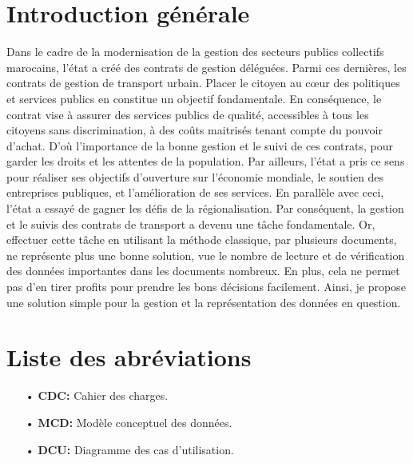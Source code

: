 \documentclass[a4paper]{report}
\begin{document}
\newpage

\begin{doublespace}
	\chapter*{\centering Introduction générale}

	Dans le cadre de la modernisation de la gestion des secteurs publics
	collectifs
	marocains, l’état a créé des contrats de gestion déléguées. Parmi ces
	dernières, les
	contrats de gestion de transport urbain. Placer le citoyen au cœur des
	politiques et
	services publics en constitue un objectif fondamentale. En conséquence, le
	contrat
	vise à assurer des services publics de qualité, accessibles à tous les
	citoyens sans discrimination, à des coûts maitrisés tenant compte du
	pouvoir
	d’achat. D'où  l'importance de la bonne gestion et le suivi de ces
	contrats, pour garder
	les droits et les attentes de la population.
	Par ailleurs, l’état a pris ce sens pour réaliser ses objectifs d’ouverture
	sur l’économie
	mondiale, le soutien des entreprises publiques, et l’amélioration de ses
	services.
	En parallèle avec ceci, l’état a essayé de gagner les défis de la
	régionalisation.
	Par conséquent, la gestion et le suivis des contrats de transport a devenu
	une tâche
	fondamentale. Or, effectuer cette tâche en utilisant la méthode classique,
	par plusieurs documents,
	ne représente plus une bonne solution, vue le nombre de lecture et de
	vérification
	des données importantes dans les documents nombreux. En plus, cela ne
	permet pas d’en
	tirer profits pour prendre les bons décisions facilement. Ainsi, je propose
	une
	solution simple pour la gestion et la représentation des données en
	question.

	\newpage

	\chapter*{\centering Liste des abréviations}
	\begin{itemize}
		\item[•] \textbf{CDC:} Cahier des charges.
		\item[•] \textbf{MCD:} Modèle conceptuel des données.
		\item[•] \textbf{DCU:} Diagramme des cas d'utilisation.
	\end{itemize}


\end{doublespace}
\end{document}
